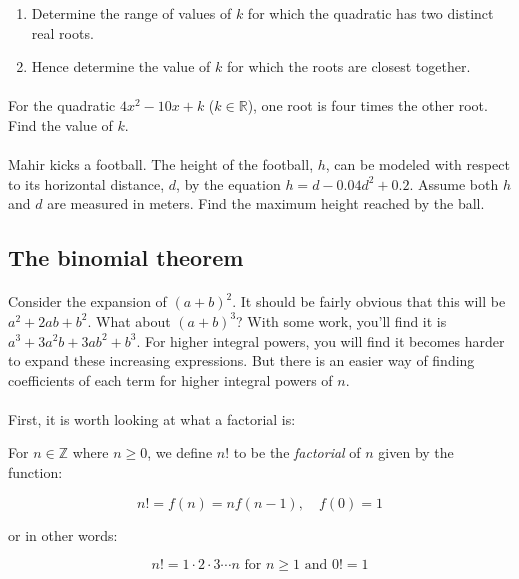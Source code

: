 \documentclass[12pt, a4paper, titlepage, twoside]{article}
\newcommand*{\Z}{\mathbb{Z}}
\newcommand*{\R}{\mathbb{R}}
\begin{document}
	\begin{enumerate}[label=\textbf{(\alph*)}]
		\item Determine the range of values of $k$ for which the quadratic has two distinct real roots.
		\item Hence determine the value of $k$ for which the roots are closest together.
	\end{enumerate}
	
	\paragraph{}
	 For the quadratic $4x^2 - 10x + k$ ($k \in \R$), one root is four times the other root.
	Find the value of $k$.
	
	\paragraph{}
	 Mahir kicks a football. The height of the football, $h$, can be modeled with respect to its horizontal
	distance, $d$, by the equation $h = d-0.04d^2+0.2$. Assume both $h$ and $d$ are measured in meters.
	Find the maximum height reached by the ball.


	\newpage
	
	\subsection{The binomial theorem}
	
	\paragraph{}
	Consider the expansion of $(a+b)^2$. It should be fairly obvious that this will be $a^2 + 2ab + b^2$. What about $(a+b)^3$?
	With some work, you'll find it is $a^3 + 3a^2b + 3ab^2 + b^3$. For higher integral powers, you will find it becomes harder to
	expand these increasing expressions. But there is an easier way of finding coefficients of each term for higher integral powers of $n$.
	
	\paragraph{}
	First, it is worth looking at what a factorial is:\\
	
	\begin{kp}
		For $n \in \Z$ where $n \geq 0$, we define $n!$ to be the \textit{factorial} of $n$ given by the function:
		
		$$n! = f(n) = n f(n-1), \quad f(0) = 1$$
		
		or in other words:
		
		$$n! = 1 \cdot 2 \cdot 3 \cdots n \text{ for } n \geq 1 \text{ and } 0! = 1$$
	\end{kp}
	
\end{document}

